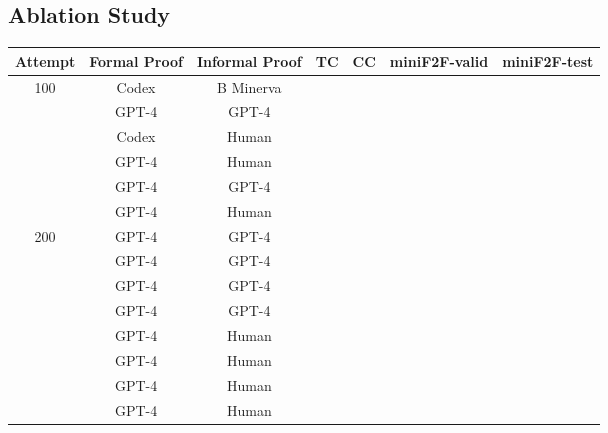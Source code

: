 \documentclass{article} \usepackage{iclr2024_conference,times}
\def\methodOne{TC\xspace}
\def\methodOneFull{\textit{Tool Correction}\xspace}
\def\methodTwo{CC\xspace}
\def\methodTwoFull{\textit{Conjecture Correction}\xspace}
\begin{document}
\subsection{Ablation Study}
\begin{table*}[t]
\begin{center}
\caption{
\small
\textbf{Ablation results on the miniF2F dataset with Isabelle.} There are three important conclusions: 1) GPT-4 is better than Codex for mathematical proving; 2) \methodOneFull can consistently improve performance; 3) \methodTwoFull can improve performance but needs more attempts. \textbf{Our proposed method degrades to DSP~\citep{jiang2023draft} when without \methodOneFull and \methodTwoFull}.
}
\label{tab:ablation_study} \small
\begin{tabular}{ccccccc}
    \toprule
    Attempt &  Formal Proof &  Informal Proof& \methodOne & \methodTwo & miniF2F-valid & miniF2F-test\\
    

    \midrule
     \multirow{6}{*}{100}   &Codex  &B Minerva& &  &  &  \\
     &  GPT-4 &   GPT-4 &  &  &  &  \\
     \cmidrule{2-7}
      &  Codex &  Human &  &  &  &  \\
       &  GPT-4 &    Human &  &  &  &  \\
\cmidrule{2-7}

     
     &  GPT-4 &   GPT-4 & & &  &  \\
     &   GPT-4 &   Human & &  &  &  \\
    \midrule


  \multirow{8}{*}{200} & GPT-4 &   GPT-4 &  &  &  &  \\
   & GPT-4 &    GPT-4 &  &  &  &  \\
    &  GPT-4 &    GPT-4 &  &  &  &  \\
     &  GPT-4 &    GPT-4 &  &  &  &  \\
     \cmidrule{2-7}

      &    GPT-4 &    Human &  &  &  &  \\
  &   GPT-4 &    Human &  &  &  &  \\
   &  GPT-4 &    Human &  &  &  &  \\
    &   GPT-4 &    Human &  &  &  &  \\

   
    \bottomrule
\end{tabular}
\end{center}
\vspace{-0.1in}
\end{table*}
\end{document}
